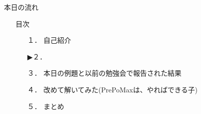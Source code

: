 \begin{frame}{本日の流れ}
  \begin{itemize}
      \item[] 目次
      \begin{itemize}[itemsep=1.3ex, leftmargin=1cm]
        \item[１．]  {\color{cud_lightgray} 自己紹介}
        \item[▶２．] 
        \item[３．] 本日の例題と以前の勉強会で報告された結果
        \item[４．] 改めて解いてみた(PrePoMaxは、やればできる子)
        \item[５．] まとめ
     \end{itemize}
  \end{itemize}
\end{frame}
